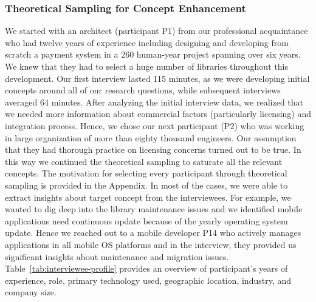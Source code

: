 \subsubsection{Theoretical Sampling for Concept Enhancement}

We started with an architect (participant P1) from our professional acquaintance who had twelve years of experience including designing and developing from scratch a payment system in a 260 human-year project spanning over six years. We knew that they had to select a huge number of libraries throughout this development. Our first interview lasted  115 minutes, as we were developing initial concepts around all of our research questions, while subsequent interviews averaged 64 minutes. %
After analyzing the initial interview data, we realized that we needed more information about commercial factors (particularly licensing) and integration process. Hence, we chose our next participant (P2) who was working in large organization of more than eighty thousand engineers. Our assumption that they had thorough practice on licensing concerns turned out to be true. In this way we continued the theoretical sampling to saturate all the relevant concepts. The motivation for selecting every participant through theoretical sampling is provided in the Appendix. In most of the cases, we were able to extract insights about target concept from the interviewees. For example, we wanted to dig deep into the library maintenance issues and we identified mobile applications need continuous update because of the yearly operating system update. Hence we reached out to a mobile developer P14 who actively manages applications in all mobile OS platforms and in the interview, they provided us significant insights about maintenance and migration issues. Table~\ref{tab:interviewee-profile} provides an overview of participant's years of experience, role, primary technology used, geographic location, industry, and company size.

